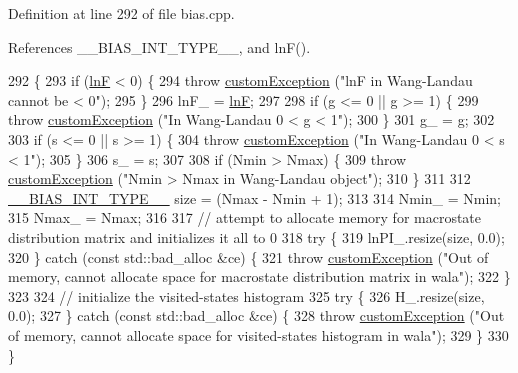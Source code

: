Definition at line 292 of file bias.\+cpp.



References \+\_\+\+\_\+\+B\+I\+A\+S\+\_\+\+I\+N\+T\+\_\+\+T\+Y\+P\+E\+\_\+\+\_\+, and ln\+F().


\begin{DoxyCode}
292                                                                                             \{
293                 \textcolor{keywordflow}{if} (\hyperlink{classwala_acb8e59580d97bc3c5b9b4ff45eb6bb9a}{lnF} < 0) \{
294                                 \textcolor{keywordflow}{throw} \hyperlink{classcustom_exception}{customException} (\textcolor{stringliteral}{"lnF in Wang-Landau cannot be < 0"});
295                 \}
296                 lnF\_ = \hyperlink{classwala_acb8e59580d97bc3c5b9b4ff45eb6bb9a}{lnF};
297                 
298                 \textcolor{keywordflow}{if} (g <= 0 || g >= 1) \{
299                                 \textcolor{keywordflow}{throw} \hyperlink{classcustom_exception}{customException} (\textcolor{stringliteral}{"In Wang-Landau 0 < g < 1"});
300                 \}
301                 g\_ = g;
302                 
303                 \textcolor{keywordflow}{if} (s <= 0 || s >= 1) \{
304                                 \textcolor{keywordflow}{throw} \hyperlink{classcustom_exception}{customException} (\textcolor{stringliteral}{"In Wang-Landau 0 < s < 1"});
305                 \}
306                 s\_ = s;
307                                 
308                 \textcolor{keywordflow}{if} (Nmin > Nmax) \{
309                                 \textcolor{keywordflow}{throw} \hyperlink{classcustom_exception}{customException} (\textcolor{stringliteral}{"Nmin > Nmax in Wang-Landau object"});
310                 \}
311                 
312                 \hyperlink{bias_8h_a1ceb524363fcb94da0c64d297ea27438}{\_\_BIAS\_INT\_TYPE\_\_} size = (Nmax - Nmin + 1);
313                 
314                 Nmin\_ = Nmin;
315                 Nmax\_ = Nmax;
316                 
317                 \textcolor{comment}{// attempt to allocate memory for macrostate distribution matrix and initializes it all to
       0}
318                 \textcolor{keywordflow}{try} \{
319                                 lnPI\_.resize(size, 0.0);
320                 \} \textcolor{keywordflow}{catch} (\textcolor{keyword}{const} std::bad\_alloc &ce) \{
321                                 \textcolor{keywordflow}{throw} \hyperlink{classcustom_exception}{customException} (\textcolor{stringliteral}{"Out of memory, cannot allocate space
       for macrostate distribution matrix in wala"});
322                 \}
323                 
324                 \textcolor{comment}{// initialize the visited-states histogram}
325                 \textcolor{keywordflow}{try} \{
326                                 H\_.resize(size, 0.0);
327                 \} \textcolor{keywordflow}{catch} (\textcolor{keyword}{const} std::bad\_alloc &ce) \{
328                                 \textcolor{keywordflow}{throw} \hyperlink{classcustom_exception}{customException} (\textcolor{stringliteral}{"Out of memory, cannot allocate space
       for visited-states histogram in wala"});
329                 \}
330 \}
\end{DoxyCode}


